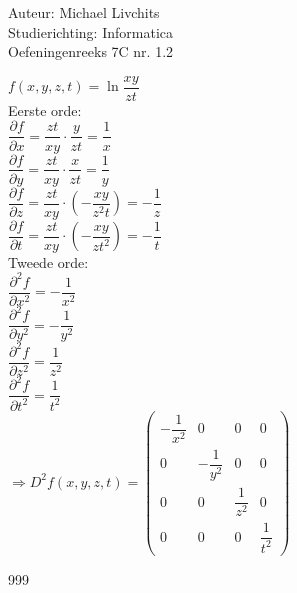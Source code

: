 \documentclass[a4paper]{article}
\begin{document}
  
\noindent \large Auteur: Michael Livchits \\
\noindent \large Studierichting: Informatica\\
\noindent \large Oefeningenreeks 7C nr. 1.2\\

\medskip

\normalsize

$f(x,y,z,t)= \ln \dfrac{xy}{zt}$\\
	
Eerste orde:\\
	
$\dfrac{\partial f}{\partial x} = \dfrac{zt}{xy}\cdot\dfrac{y}{zt} = \dfrac{1}{x}$\\
	
$\dfrac{\partial f}{\partial y} = \dfrac{zt}{xy}\cdot\dfrac{x}{zt} = \dfrac{1}{y}$\\
	
$\dfrac{\partial f}{\partial z} = \dfrac{zt}{xy}\cdot\left(-\dfrac{xy}{z^2t}\right) = -\dfrac{1}{z}$\\
	
$\dfrac{\partial f}{\partial t} = \dfrac{zt}{xy}\cdot\left(-\dfrac{xy}{zt^2}\right) = -\dfrac{1}{t}$\\

Tweede orde:\\
	
$\dfrac{\partial^2 f}{\partial x^2} = -\dfrac{1}{x^2}$\\
	
$\dfrac{\partial^2 f}{\partial y^2} = -\dfrac{1}{y^2}$\\
	
$\dfrac{\partial^2 f}{\partial z^2} = \dfrac{1}{z^2}$\\
	
$\dfrac{\partial^2 f}{\partial t^2} = \dfrac{1}{t^2}$\\

$\Rightarrow D^2f(x,y,z,t) = \left(\begin{array}{cccc}
-\dfrac{1}{x^2}&0&0&0 \\
0&-\dfrac{1}{y^2}&0&0 \\
0&0&\dfrac{1}{z^2}&0 \\
0&0&0&\dfrac{1}{t^2}
\end{array}\right)$\\

\begin{thebibliography}{999}
\end{thebibliography}
\end{document}
